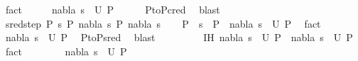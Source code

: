 \begin{isabellebody}
\ fact{\isacharplus}{\kern0pt}\isanewline
\ \ \isamarkupfalse%
\ \isamarkupfalse%
\ {\isachardoublequoteopen}{\isacharparenleft}{\kern0pt}nabla{}{\isacharcomma}{\kern0pt}\ s{}{\isacharparenright}{\kern0pt}\ {\isasymin}\ U\ P{}{\isachardoublequoteclose}\isanewline
\ \ \ \ \isamarkupfalse%
\ P{}{\isacharunderscore}{\kern0pt}to{\isacharunderscore}{\kern0pt}P{}{\isacharunderscore}{\kern0pt}cred\ \isamarkupfalse%
\ blast\isanewline
{}\isamarkupfalse%
\isanewline
\ \ \isamarkupfalse%
\ {\isacharparenleft}{\kern0pt}sred{\isacharunderscore}{\kern0pt}step\ P{}\ s\ P{}\ nabla{}\ s{}\ P{}\ nabla{}\ s{}{\isacharparenright}{\kern0pt}\isanewline
\ \ \isamarkupfalse%
\ {\isachardoublequoteopen}P{}\ {\isasymturnstile}\ s\ {\isasymleadsto}\ P{}{\isachardoublequoteclose}\ \ {\isachardoublequoteopen}{\isacharparenleft}{\kern0pt}nabla{}{\isacharcomma}{\kern0pt}\ s{}{\isacharparenright}{\kern0pt}\ {\isasymin}\ U\ P{}{\isachardoublequoteclose}\ \isamarkupfalse%
\ fact{\isacharplus}{\kern0pt}\isanewline
\ \ \isamarkupfalse%
\ \isamarkupfalse%
\ {\isachardoublequoteopen}{\isacharparenleft}{\kern0pt}nabla{}{\isacharcomma}{\kern0pt}\ s{}{\isacharparenright}{\kern0pt}\ {\isasymin}\ U\ P{}{\isachardoublequoteclose}\ \isamarkupfalse%
\ P{}{\isacharunderscore}{\kern0pt}to{\isacharunderscore}{\kern0pt}P{}{\isacharunderscore}{\kern0pt}sred\ \isamarkupfalse%
\ blast\ \isanewline
\ \ \isamarkupfalse%
\ \isanewline
\ \ \isamarkupfalse%
\ IH{\isacharcolon}{\kern0pt}\ {\isachardoublequoteopen}{\isacharparenleft}{\kern0pt}nabla{}{\isacharcomma}{\kern0pt}\ s{}{\isacharparenright}{\kern0pt}\ {\isasymin}\ U\ P{}\ {\isasymLongrightarrow}\ {\isacharparenleft}{\kern0pt}nabla{}{\isacharcomma}{\kern0pt}\ s{}{\isacharparenright}{\kern0pt}\ {\isasymin}\ U\ P{}{\isachardoublequoteclose}\ \isamarkupfalse%
\ fact\isanewline
\ \ \isamarkupfalse%
\ \isanewline
\ \ \isamarkupfalse%
\ {\isachardoublequoteopen}{\isacharparenleft}{\kern0pt}nabla{}{\isacharcomma}{\kern0pt}\ s{}{\isacharparenright}{\kern0pt}\ {\isasymin}\ U\ P{}{\isachardoublequoteclose}\ \isamarkupfalse%

\end{isabellebody}
